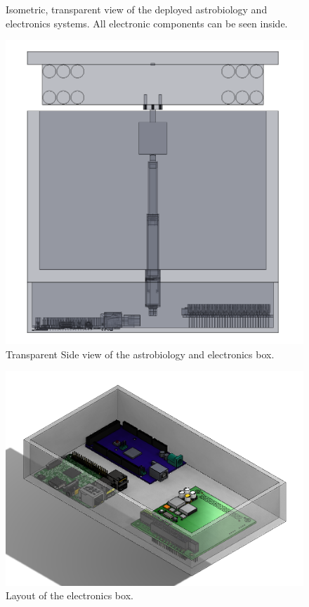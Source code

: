 \begin{centering}
\begin{figure}[h]
    \caption{Isometric, transparent view of the deployed astrobiology and electronics systems. All electronic components can be seen inside.}
    \label{fig:astrobio-electronics-image}
  \end{figure}
  \begin{figure}[h]
    \includegraphics[width=\textwidth]{Figures/astrobio-electronics-deployed-transparent-sideview.png}
    \caption{Transparent Side view of the astrobiology and electronics box.}
    \label{fig:astrobio-electronics-image-sideview}
  \end{figure}
  \begin{figure}[h]
    \includegraphics[width=\textwidth]{Figures/electronics-box.png}
    \caption{Layout of the electronics box.}
    \label{fig:electronics-box}
  \end{figure}  


\end{centering}
